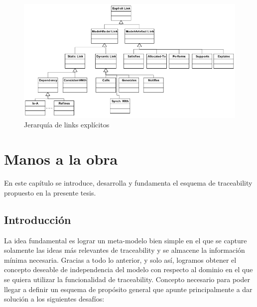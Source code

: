 \documentclass[a4paper,12pt,oneside]{book}
\begin{document}
\begin{figure}[hbtp]
\centering
\includegraphics[scale=0.51]{./img/ExplicitTraceLinks}
\caption{Jerarquía de links explícitos}
\label{fig:LinksExplicitos}
\end{figure}



\chapter{Manos a la obra}
\label{cap:Propuesta}

En este capítulo se introduce, desarrolla y fundamenta el esquema de traceability propuesto en la presente tesis. 

\section{Introducción}
\label{sec:EsquemaPropIntro}

La idea fundamental es lograr un meta-modelo bien simple en el que se capture solamente las ideas más relevantes de traceability y se almacene la información mínima necesaria. Gracias a todo lo anterior, y solo así, logramos obtener el concepto deseable de independencia del modelo con respecto al dominio en el que se quiera utilizar la funcionalidad de traceability. Concepto necesario para poder llegar a definir un esquema de propósito general que apunte principalmente a dar solución a los siguientes desafíos:
\end{document}
